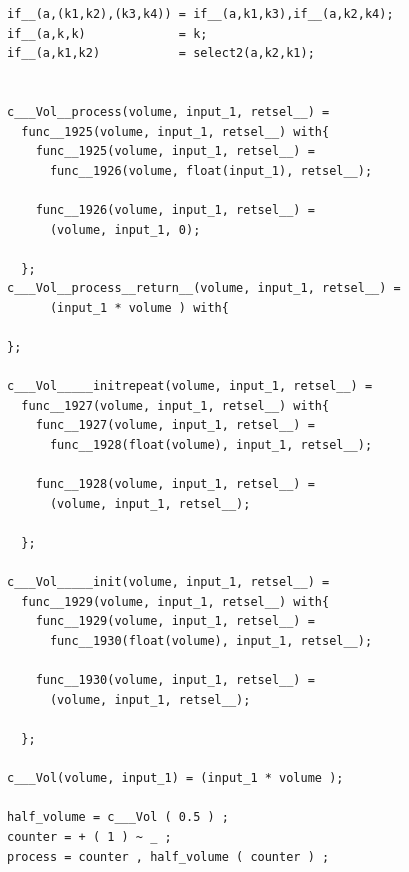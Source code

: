 \documentclass{article}
\begin{document}
\bigskip\bigskip
\begin{lstlisting}[caption=\texttt{vol.dsp_generated.dsp}]
if__(a,(k1,k2),(k3,k4)) = if__(a,k1,k3),if__(a,k2,k4);
if__(a,k,k)             = k;
if__(a,k1,k2)           = select2(a,k2,k1);


c___Vol__process(volume, input_1, retsel__) = 
  func__1925(volume, input_1, retsel__) with{
    func__1925(volume, input_1, retsel__) = 
      func__1926(volume, float(input_1), retsel__);

    func__1926(volume, input_1, retsel__) = 
      (volume, input_1, 0);

  };
c___Vol__process__return__(volume, input_1, retsel__) = 
      (input_1 * volume ) with{
  
};

c___Vol_____initrepeat(volume, input_1, retsel__) = 
  func__1927(volume, input_1, retsel__) with{
    func__1927(volume, input_1, retsel__) = 
      func__1928(float(volume), input_1, retsel__);

    func__1928(volume, input_1, retsel__) = 
      (volume, input_1, retsel__);

  };

c___Vol_____init(volume, input_1, retsel__) = 
  func__1929(volume, input_1, retsel__) with{
    func__1929(volume, input_1, retsel__) = 
      func__1930(float(volume), input_1, retsel__);

    func__1930(volume, input_1, retsel__) = 
      (volume, input_1, retsel__);

  };

c___Vol(volume, input_1) = (input_1 * volume );

half_volume = c___Vol ( 0.5 ) ; 
counter = + ( 1 ) ~ _ ; 
process = counter , half_volume ( counter ) ; 
                         
\end{lstlisting}
\end{document}
